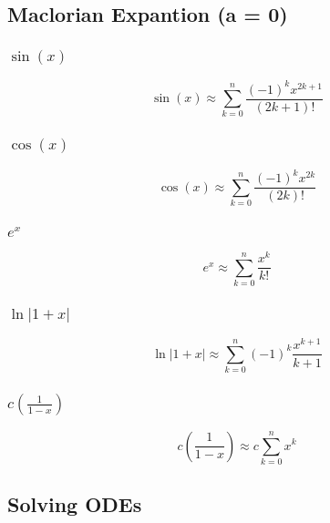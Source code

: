 \documentclass{article}
\begin{document}
        \subsection{Maclorian Expantion (a = 0)}

        \subsubsection{$\sin(x)$}
        \begin{equation}
            \sin(x) \approx \sum_{k=0}^{n} \frac {(-1)^kx^{2k+1}} {(2k+1)!}
        \end{equation}

            
        \subsubsection{$\cos(x)$}
        \begin{equation}
            \cos(x) \approx \sum_{k=0}^{n} \frac {(-1)^kx^{2k}} {(2k)!}
        \end{equation}

        \subsubsection{$e^x$}
        \begin{equation}
            e^x \approx \sum_{k=0}^n \frac {x^k} {k!}
        \end{equation}

        \subsubsection{$\ln|1+x|$}
        \begin{equation}
            \ln|1+x| \approx \sum_{k=0}^n (-1)^{k} \frac {x^{k+1}} {k+1}
        \end{equation}

        \subsubsection{$c(\frac {1} {1-x})$}
        \begin{equation}
            c(\frac {1} {1-x}) \approx c \sum_{k=0}^{n} x^k
        \end{equation}

        \subsection{Solving ODEs}
\end{document}
